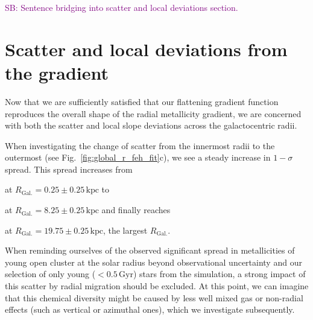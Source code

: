 \documentclass[fleqn,usenatbib]{mnras}
\newcommand{\SB}[1]{{\textcolor{purple}{SB: #1}}}
\newcommand{\nihaoAGEmax}{$0.5\,\mathrm{Gyr}$}
\begin{document}
\SB{Sentence bridging into scatter and local deviations section.}

\section{Scatter and local deviations from the gradient}
\label{sec:scatter_radial_metallicity_gradients}

Now that we are sufficiently satisfied that our flattening gradient function reproduces the overall shape of the radial metallicity gradient, we are concerned with both the scatter and local slope deviations across the galactocentric radii.

When investigating the change of scatter from the innermost radii to the outermost (see Fig.~\ref{fig:global_r_feh_fit}c), we see a steady increase in $1-\sigma$ spread. This spread increases from
\begin{description}
    \item  at $R_\mathrm{Gal.} = 0.25 \pm 0.25\,\mathrm{kpc}$ to
    \item  at $R_\mathrm{Gal.} = 8.25 \pm 0.25\,\mathrm{kpc}$ and finally reaches 
     \item  at $R_\mathrm{Gal.} = 19.75 \pm 0.25\,\mathrm{kpc}$, the largest $R_\mathrm{Gal.}$.
\end{description}

When reminding ourselves of the observed significant spread in metallicities of young open cluster at the solar radius beyond observational uncertainty \citep[e.g.][]{Donor2020, Spina2021} and our selection of only young ($<$\nihaoAGEmax) stars from the simulation, a strong impact of this scatter by radial migration should be excluded. At this point, we can imagine that this chemical diversity might be caused by less well mixed gas or non-radial effects (such as vertical or azimuthal ones), which we investigate subsequently.
\end{document}
